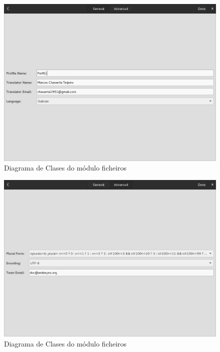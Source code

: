 \begin{figure}[h!]
    \centering
    \includegraphics[width=\textwidth]{img/panel_pefil_xeral.png}
    \caption{Diagrama de Clases do módulo ficheiros}
    \label{fig:dia_class:files}
\end{figure}

\begin{figure}[h!]
    \centering
    \includegraphics[width=\textwidth]{img/panel_perfil_avanzado.png}
    \caption{Diagrama de Clases do módulo ficheiros}
    \label{fig:dia_class:files}
\end{figure}

